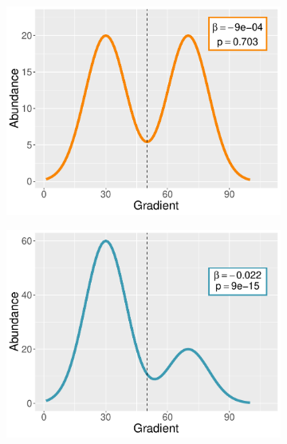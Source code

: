 		\begin{figure}[h!]
			
			\begin{subfigure}{0.5\textwidth}
				\centering
				\includegraphics[width=1\linewidth]{../02_Figures/bi1}
				\caption{}
				\label{fig:biglm1}
			\end{subfigure}
			\begin{subfigure}{0.5\textwidth}
				\centering
				\includegraphics[width=1\linewidth]{../02_Figures/bi2}
				\caption{}
				\label{fig:biglm2}
			\end{subfigure}
			\begin{subfigure}{0.5\textwidth}
				\centering

\end{subfigure}
\end{figure}
